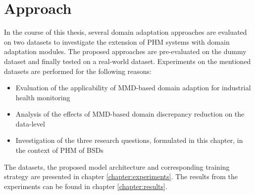\section{Approach}
In the course of this thesis, several domain adaptation approaches are evaluated on two datasets to investigate the extension of PHM systems with domain adaptation modules. The proposed approaches are pre-evaluated on the dummy dataset and finally tested on a real-world dataset. Experiments on the mentioned datasets are performed for the following reasons:
\begin{itemize}
    \item Evaluation of the applicability of MMD-based domain adaption for industrial health monitoring
    \item Analysis of the effects of MMD-based domain discrepancy reduction on the data-level
    \item Investigation of the three research questions, formulated in this chapter, in the context of PHM of BSDs
\end{itemize}

The datasets, the proposed model architecture and corresponding training strategy are presented in chapter \ref{chapter:experiments}. The results from the experiments can be found in chapter \ref{chapter:results}. 
\begin{comment}
\section{Signals used for PHM}
In the work of Pandhare et al. \cite{Pandhare2021} just vibration signals in different spatial directions are measured with sensors, installed at various locations on the BSD. Azamfar et al. \cite{AZAMFAR2020103932} additionally use sound pressure sensors to capture the acoustic level and extract torque and speed signals from the controller. In this thesis also the mechanical power, target electrical power and actual electrical power signals were extracted from the controller. Pandhare et al. and Azamfar et al. record machine data during BSD steady-state motion. In this thesis machine data is collected during different machine excitements (constant speed excitements, direction change excitements and sweep excitement) along the machine tools X-axis. These different signals were evaluated for their suitability for PHM of BSDs


Both Pandhare et al. \cite{Pandhare2021} and Azamfar et al. \cite{AZAMFAR2020103932} feed the data recorded during BSD steady-state motion as one single input to their models. During the phases of constant BSD motion, the amplitude of the signals changess. Azamfar et al. assume that the shorter sequences created by a windowing function just capture limited information about these changes and are therefore not a proper tool for PHM \cite{AZAMFAR2020103932}. In the thesis a windowing function was evaluated for the PHM of BSDs. Windowing functions make the BSD experiments less dependent from specific BSD excitements. When beeing able to check the BSD degradation with short recorded windows, one can make statements about the BSD health status with data redcorded in real time use. Extra experiments 
\end{comment}


